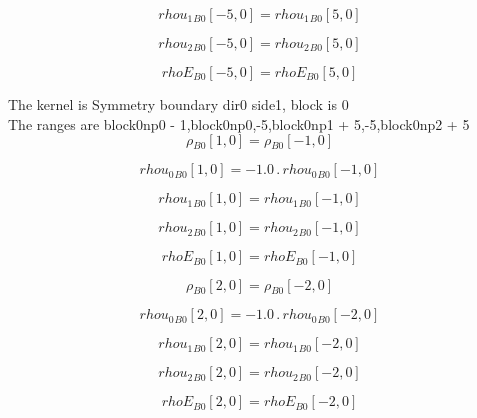 \documentclass{article}
\begin{document}
\begin{dmath}{rhou_{1}{_{B0}}}[{-5,0}] = {rhou_{1}{_{B0}}}[{5,0}]\end{dmath}

\begin{dmath}{rhou_{2}{_{B0}}}[{-5,0}] = {rhou_{2}{_{B0}}}[{5,0}]\end{dmath}

\begin{dmath}{rhoE{_{B0}}}[{-5,0}] = {rhoE{_{B0}}}[{5,0}]\end{dmath}

\noindent The kernel is Symmetry boundary dir0 side1, block is 0\\\noindent The ranges are block0np0 - 1,block0np0,-5,block0np1 + 5,-5,block0np2 + 5\\\begin{dmath}{\rho{_{B0}}}[{1,0}] = {\rho{_{B0}}}[{-1,0}]\end{dmath}

\begin{dmath}{rhou_{0}{_{B0}}}[{1,0}] = - 1.0 \,.\, {rhou_{0}{_{B0}}}[{-1,0}]\end{dmath}

\begin{dmath}{rhou_{1}{_{B0}}}[{1,0}] = {rhou_{1}{_{B0}}}[{-1,0}]\end{dmath}

\begin{dmath}{rhou_{2}{_{B0}}}[{1,0}] = {rhou_{2}{_{B0}}}[{-1,0}]\end{dmath}

\begin{dmath}{rhoE{_{B0}}}[{1,0}] = {rhoE{_{B0}}}[{-1,0}]\end{dmath}

\begin{dmath}{\rho{_{B0}}}[{2,0}] = {\rho{_{B0}}}[{-2,0}]\end{dmath}

\begin{dmath}{rhou_{0}{_{B0}}}[{2,0}] = - 1.0 \,.\, {rhou_{0}{_{B0}}}[{-2,0}]\end{dmath}

\begin{dmath}{rhou_{1}{_{B0}}}[{2,0}] = {rhou_{1}{_{B0}}}[{-2,0}]\end{dmath}

\begin{dmath}{rhou_{2}{_{B0}}}[{2,0}] = {rhou_{2}{_{B0}}}[{-2,0}]\end{dmath}

\begin{dmath}{rhoE{_{B0}}}[{2,0}] = {rhoE{_{B0}}}[{-2,0}]\end{dmath}
\end{document}
